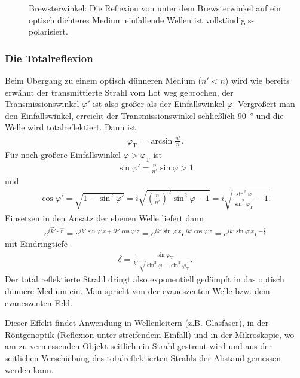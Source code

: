 \begin{figure}[htb]
    \centering
    \tfigBrewsterAngle
    \caption{Brewsterwinkel: Die Reflexion von unter dem Brewsterwinkel auf ein optisch dichteres Medium einfallende Wellen ist vollständig s-polarisiert. }
    \label{fig:brewsterwinkel}
\end{figure}

\subsubsection{Die Totalreflexion}

Beim Übergang zu einem optisch dünneren Medium ($n'<n$) wird wie bereits erwähnt der transmittierte Strahl vom Lot weg gebrochen, der Transmissionswinkel $\varphi'$ ist also größer als der Einfallswinkel $\varphi$.
Vergrößert man den Einfallswinkel, erreicht der Transmissionswinkel schließlich \SI{90}{\degree} und die Welle wird totalreflektiert.
Dann ist
\begin{align}
    \label{eq:totalreflexion}
    \varphi_\mathrm{T} = \arcsin\frac{n'}{n}.
\end{align}
Für noch größere Einfallswinkel $\varphi>\varphi_\mathrm{T}$ ist
\begin{align*}
    \sin\varphi'=\frac{n}{n'}\sin\varphi>1
\end{align*}
und
\begin{align*}
    \cos\varphi'=\sqrt{1-\sin^2\varphi'}=i\sqrt{\left(\frac{n}{n'}\right)^2\sin^2\varphi-1}=i\sqrt{\frac{\sin^2\varphi}{\sin^2\varphi_\mathrm{T}}-1}.
\end{align*}
Einsetzen in den Ansatz der ebenen Welle liefert dann
\begin{align*}
    e^{i\vec k'\cdot \vec r} = e^{ik' \sin\varphi' x+ik'\cos\varphi' z}  = e^{ik' \sin\varphi' x}e^{ik'\cos\varphi' z} = e^{ik' \sin\varphi' x}e^{-\frac{z}{\delta}}
\end{align*}
mit Eindringtiefe
\begin{align*}
    \delta=\frac{1}{k'} \frac{\sin\varphi_\mathrm{T}}{\sqrt{\sin^2\varphi-\sin^2\varphi_\mathrm{T}}}.
\end{align*}
Der total reflektierte Strahl dringt also exponentiell gedämpft in das optisch dünnere Medium ein. Man spricht von der evaneszenten Welle bzw. dem evaneszenten Feld.

Dieser Effekt findet Anwendung in Wellenleitern (z.B. Glasfaser), in der Röntgenoptik (Reflexion unter streifendem Einfall) und in der Mikroskopie,
wo am zu vermessenden Objekt seitlich ein Strahl gestreut wird und aus der seitlichen Verschiebung des totalreflektierten Strahls der Abstand gemessen werden kann.




